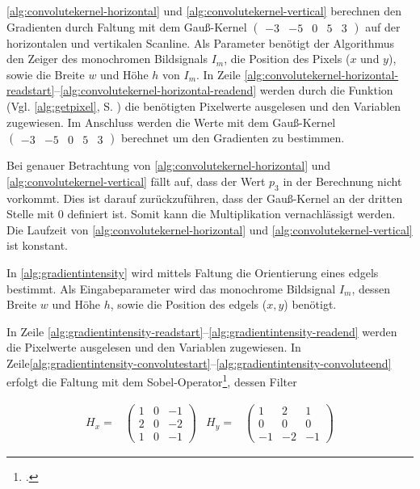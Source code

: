 \autoref{alg:convolutekernel-horizontal} und \autoref{alg:convolutekernel-vertical} berechnen den Gradienten durch Faltung mit dem Gauß-Kernel
$\left( \begin{smallmatrix}
-3& -5& 0& 5& 3
\end{smallmatrix} \right)$
 auf der horizontalen und vertikalen Scanline. Als Parameter benötigt der Algorithmus den Zeiger des monochromen
 Bildsignals $I_m$, die Position des Pixels ($x$ und $y$), sowie die Breite $w$ und Höhe $h$ von $I_m$. In Zeile
 \ref{alg:convolutekernel-horizontal-readstart}--\ref{alg:convolutekernel-horizontal-readend} werden durch die
 Funktion  (Vgl. \autoref{alg:getpixel}, S. \pageref{alg:getpixel}) die benötigten Pixelwerte
 ausgelesen und den Variablen zugewiesen. Im Anschluss werden die Werte mit dem Gauß-Kernel
$\left( \begin{smallmatrix}
-3& -5& 0& 5& 3
\end{smallmatrix} \right)$
berechnet um den Gradienten zu bestimmen.



Bei genauer Betrachtung von \autoref{alg:convolutekernel-horizontal} und \autoref{alg:convolutekernel-vertical}
 fällt auf, dass der Wert $p_3$ in der Berechnung nicht vorkommt. Dies ist darauf zurückzuführen, dass der Gauß-Kernel
 an der dritten Stelle mit $0$ definiert ist. Somit kann die Multiplikation vernachlässigt werden. Die Laufzeit von
 \autoref{alg:convolutekernel-horizontal} und \autoref{alg:convolutekernel-vertical} ist konstant.

In \autoref{alg:gradientintensity} wird mittels Faltung die Orientierung eines \glspl{edgel} bestimmt. Als
 Eingabeparameter wird das monochrome Bildsignal $I_m$, dessen Breite $w$ und Höhe $h$, sowie die Position des
 \glspl{edgel} ($x,y$) benötigt.



In Zeile \ref{alg:gradientintensity-readstart}--\ref{alg:gradientintensity-readend} werden die Pixelwerte ausgelesen
 und den Variablen zugewiesen. In
 Zeile\ref{alg:gradientintensity-convolutestart}--\ref{alg:gradientintensity-convoluteend} erfolgt die Faltung mit dem
 Sobel-Operator\footcite[Vgl.][S.~120--123]{burger05}, dessen Filter

\begin{subequations}
\begin{align}
	H_x =&
	\begin{pmatrix}
		1& 0& -1\\
		2& 0& -2\\
		1& 0& -1
	\end{pmatrix}
\end{align}
\begin{align}
	H_y =&
	\begin{pmatrix}
		1& 2& 1\\
		0& 0& 0\\
		-1& -2& -1
	\end{pmatrix}
\end{align}
\end{subequations}


